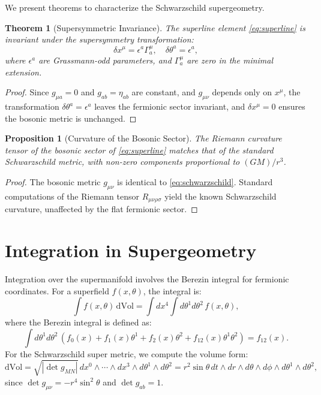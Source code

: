 \documentclass[12pt]{article}
\theoremstyle{plain}
\newtheorem{theorem}{Theorem}
\newtheorem{proposition}{Proposition}
\newcommand{\dvol}{\mathrm{dVol}}
\begin{document}
We present theorems to characterize the Schwarzschild supergeometry.

\begin{theorem}[Supersymmetric Invariance]
The superline element \eqref{eq:superline} is invariant under the supersymmetry transformation:
\begin{equation}
\delta x^{\mu} = \epsilon^{a} \Gamma^{\mu}_{a}, \quad \delta \theta^{a} = \epsilon^{a},
\end{equation}
where $\epsilon^{a}$ are Grassmann-odd parameters, and $\Gamma^{\mu}_{a}$ are zero in the minimal extension.
\end{theorem}

\begin{proof}
Since $g_{\mu a} = 0$ and $g_{ab} = \eta_{ab}$ are constant, and $g_{\mu\nu}$ depends only on $x^{\mu}$, the transformation $\delta \theta^{a} = \epsilon^{a}$ leaves the fermionic sector invariant, and $\delta x^{\mu} = 0$ ensures the bosonic metric is unchanged.
\end{proof}

\begin{proposition}[Curvature of the Bosonic Sector]
The Riemann curvature tensor of the bosonic sector of \eqref{eq:superline} matches that of the standard Schwarzschild metric, with non-zero components proportional to $(GM)/r^{3}$.
\end{proposition}

\begin{proof}
The bosonic metric $g_{\mu\nu}$ is identical to \eqref{eq:schwarzschild}. Standard computations of the Riemann tensor $R_{\mu\nu\rho\sigma}$ yield the known Schwarzschild curvature, unaffected by the flat fermionic sector.
\end{proof}

\section{Integration in Supergeometry}

Integration over the supermanifold involves the Berezin integral for fermionic coordinates. For a superfield $f(x, \theta)$, the integral is:
\begin{equation}
\int f(x, \theta) \, \dvol = \int dx^{4} \int d\theta^{1} d\theta^{2} \, f(x, \theta),
\end{equation}
where the Berezin integral is defined as:
\begin{equation}
\int d\theta^{1} d\theta^{2} \, (f_{0}(x) + f_{1}(x) \theta^{1} + f_{2}(x) \theta^{2} + f_{12}(x) \theta^{1} \theta^{2}) = f_{12}(x).
\end{equation}
For the Schwarzschild super metric, we compute the volume form:
\begin{equation}
\dvol = \sqrt{|\det g_{MN}|} \, dx^{0} \wedge \cdots \wedge dx^{3} \wedge d\theta^{1} \wedge d\theta^{2} = r^{2} \sin\theta \, dt \wedge dr \wedge d\theta \wedge d\phi \wedge d\theta^{1} \wedge d\theta^{2},
\end{equation}
since $\det g_{\mu\nu} = -r^{4} \sin^{2}\theta$ and $\det g_{ab} = 1$.
\end{document}
